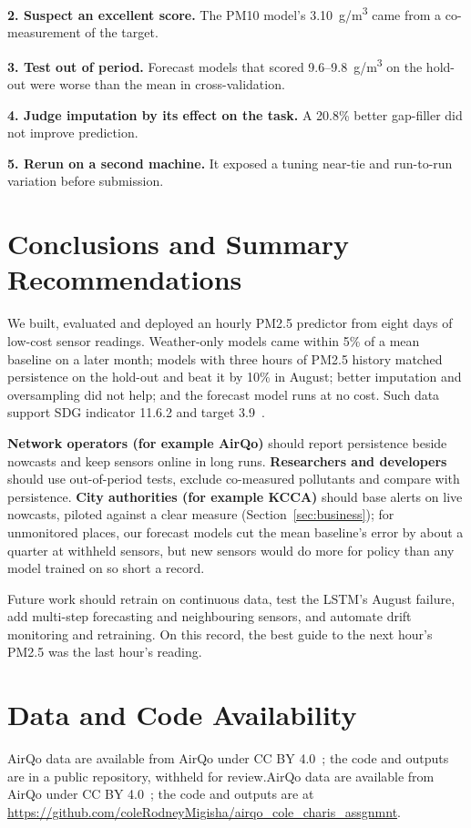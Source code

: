 \documentclass{ieeeaccess}
\newcommand{\ugm}{\textmu g/m\textsuperscript{3}}
\begin{document}
\textbf{2. Suspect an excellent score.} The PM10 model's 3.10~\ugm{} came from a co-measurement of the target.

\textbf{3. Test out of period.} Forecast models that scored 9.6--9.8~\ugm{} on the hold-out were worse than the mean in cross-validation.

\textbf{4. Judge imputation by its effect on the task.} A 20.8\% better gap-filler did not improve prediction.

\textbf{5. Rerun on a second machine.} It exposed a tuning near-tie and run-to-run variation before submission.

\section{Conclusions and Summary Recommendations}\label{sec:conclusions}

We built, evaluated and deployed an hourly PM2.5 predictor from eight days of low-cost sensor readings. Weather-only models came within 5\% of a mean baseline on a later month; models with three hours of PM2.5 history matched persistence on the hold-out and beat it by 10\% in August; better imputation and oversampling did not help; and the forecast model runs at no cost. Such data support SDG indicator 11.6.2 and target 3.9~\cite{ref22,ref23}.

\textbf{Network operators (for example AirQo)} should report persistence beside nowcasts and keep sensors online in long runs. \textbf{Researchers and developers} should use out-of-period tests, exclude co-measured pollutants and compare with persistence. \textbf{City authorities (for example KCCA)} should base alerts on live nowcasts, piloted against a clear measure (Section~\ref{sec:business}); for unmonitored places, our forecast models cut the mean baseline's error by about a quarter at withheld sensors, but new sensors would do more for policy than any model trained on so short a record.

Future work should retrain on continuous data, test the LSTM's August failure, add multi-step forecasting and neighbouring sensors, and automate drift monitoring and retraining. On this record, the best guide to the next hour's PM2.5 was the last hour's reading.

\section*{Data and Code Availability}

\ifblind AirQo data are available from AirQo under CC BY 4.0~\cite{ref29}; the code and outputs are in a public repository, withheld for review.\else AirQo data are available from AirQo under CC BY 4.0~\cite{ref29}; the code and outputs are at \url{https://github.com/coleRodneyMigisha/airqo_cole_charis_assgnmnt}.\fi
\end{document}
